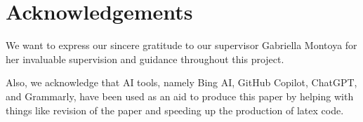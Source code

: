 \section{Acknowledgements}\label{sec:acknowledgements}
We want to express our sincere gratitude to our supervisor Gabriella Montoya for her invaluable supervision and guidance throughout this project.

Also, we acknowledge that AI tools, namely Bing AI, GitHub Copilot, ChatGPT, and Grammarly, have been used as an aid to produce this paper by helping with things like revision of the paper and speeding up the production of latex code.